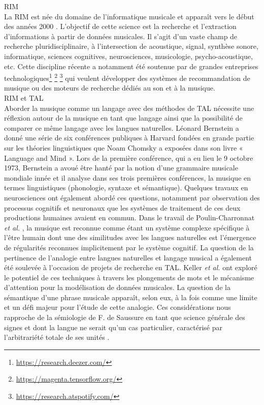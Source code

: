 RIM\\
La RIM est née du domaine de l’informatique musicale et apparaît vers le début
des années 2000 \cite{MIR_1}. L’objectif de cette science est la recherche et
l’extraction d’informations à partir de données musicales. Il s’agit d’un vaste
champ de recherche pluridisciplinaire, à l’intersection de acoustique, signal,
synthèse sonore, informatique, sciences cognitives, neurosciences, musicologie,
psycho-acoustique, etc. Cette discipline récente a notamment été soutenue par
de grandes entreprises technologiques\footnote{\url{
https://research.deezer.com/}} \footnote{\url{https://magenta.tensorflow.org/}}
\footnote{\url{https://research.atspotify.com/}} qui veulent développer des
systèmes de recommandation de musique ou des moteurs de recherche dédiés au son
et à la musique.\\

RIM et TAL \\
Aborder la musique comme un langage avec des méthodes de TAL nécessite une
réflexion autour de la musique en tant que langage ainsi que la possibilité de
comparer ce même langage avec les langues naturelles. Léonard Bernstein
\cite{lbernstein} a donné une série de six conférences publiques à Harvard
fondées en grande partie sur les théories linguistiques que Noam Chomsky a
exposées dans son livre « Language and Mind ». Lors de la première conférence,
qui a eu lieu le 9 octobre 1973, Bernstein a avoué être hanté par la notion
d’une grammaire musicale mondiale innée et il analyse dans ses trois premières
conférences, la musique en termes linguistiques (phonologie, syntaxe et
sémantique). Quelques travaux en neurosciences ont
également abordé ces questions, notamment par observation des processus
cognitifs et neuronaux que les systèmes de traitement de ces deux productions
humaines avaient en commun. Dans le travail de Poulin-Charronnat
\textit{et al.} \cite{poulincharronnat:hal-01985213}, la musique est reconnue
comme étant un système complexe spécifique à l’être humain dont une des
similitudes avec les langues naturelles est l’émergence de régularités
reconnues implicitement par le système cognitif. La question de la pertinence
de l’analogie entre langues naturelles et langage musical a également été
soulevée à l’occasion de projets de recherche en TAL. Keller \textit{et al.}
\cite{keller:hal-03279850} ont exploré le potentiel de ces techniques à travers
les plongements de mots et le mécanisme d’attention pour la modélisation de
données musicales. La question de la sémantique d’une phrase musicale apparaît,
selon eux, à la fois comme une limite et un défi majeur pour l’étude de cette
analogie. Ces considérations nous rapproche de la sémiologie de F. de Saussure
en tant que science générale des signes et dont la langue ne serait qu’un cas
particulier, caractérisé par l’arbitrariété totale de ses unités
\cite{wunderli2017ferdinand}.


